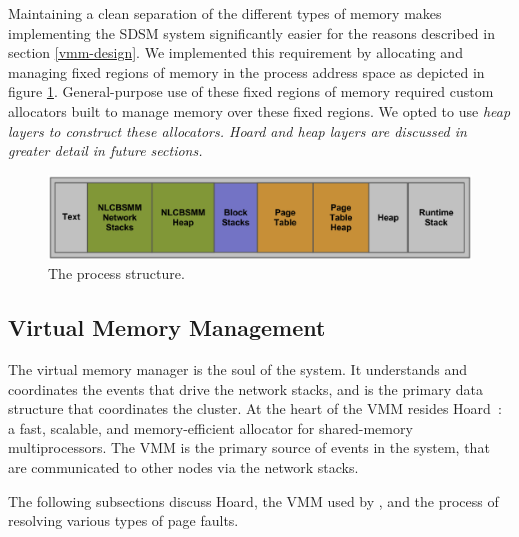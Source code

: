 Maintaining a clean separation of the different types of memory makes implementing the SDSM system significantly easier for the reasons described in section \ref{vmm-design}.  We implemented this requirement by allocating and managing fixed regions of memory in the process address space as depicted in figure \ref{process-structure}.  General-purpose use of these fixed regions of memory required custom allocators built to manage memory over these fixed regions.  We opted to use \em heap layers \em to construct these allocators.  Hoard and \em heap layers \em are discussed in greater detail in future sections.

\begin{figure}[t]
\centering
\includegraphics[scale=0.40]{images/process-structure.eps}
\caption{The \projname{} process structure.}
\label{process-structure}
\end{figure}

\subsection{Virtual Memory Management}
The virtual memory manager is the soul of the \projname{} system.  It understands and coordinates the events that drive the network stacks, and is the primary data structure that coordinates the cluster.  At the heart of the VMM resides Hoard~\cite{Berger:1999:HFS:899944, Berger:2000:HSM:356989.357000}: a fast, scalable, and memory-efficient allocator for shared-memory multiprocessors.  The VMM is the primary source of events in the system, that are communicated to other nodes via the network stacks.

The following subsections discuss Hoard, the VMM used by \projname{}, and the process of resolving various types of page faults.

